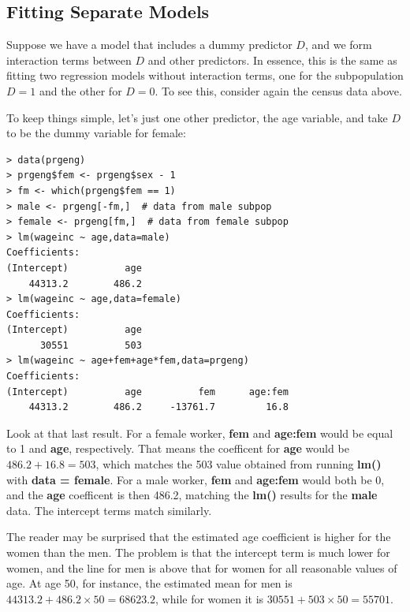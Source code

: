 \subsection{Fitting Separate Models}
\label{separate}

Suppose we have a model that includes a dummy predictor $D$, and we form
interaction terms between $D$ and other predictors.  In essence, this is
the same as fitting two regression models without interaction terms, one
for the subpopulation $D = 1$ and the other for $D = 0$.  To see this,
consider again the census data above.

To keep things simple, let's just one other predictor, the age variable,
and take $D$ to be the dummy variable for female:

\begin{lstlisting}
> data(prgeng) 
> prgeng$fem <- prgeng$sex - 1 
> fm <- which(prgeng$fem == 1) 
> male <- prgeng[-fm,]  # data from male subpop
> female <- prgeng[fm,]  # data from female subpop
> lm(wageinc ~ age,data=male) 
Coefficients:
(Intercept)          age  
    44313.2        486.2  
> lm(wageinc ~ age,data=female) 
Coefficients:
(Intercept)          age  
      30551          503  
> lm(wageinc ~ age+fem+age*fem,data=prgeng) 
Coefficients:
(Intercept)          age          fem      age:fem  
    44313.2        486.2     -13761.7         16.8  
\end{lstlisting}

Look at that last result.  For a female worker, {\bf fem} and {\bf
age:fem} would be equal to 1 and {\bf age}, respectively.  That means
the coefficent for {\bf age} would be $486.2 + 16.8 = 503$, which
matches the 503 value obtained from running {\bf lm()} with {\bf data =
female}.  For a male worker, {\bf fem} and {\bf age:fem} would both be
0, and the {\bf age} coefficent is then 486.2, matching the {\bf lm()}
results for the {\bf male} data.  The intercept terms match similarly.

The reader may be surprised that the estimated age coefficient is higher
for the women than the men.  The problem is that the intercept term is
much lower for women, and the line for men is above that for women for
all reasonable values of age.  At age 50, for instance, the estimated
mean for men is $44313.2 + 486.2 \times 50 = 68623.2$, while for women
it is $30551  + 503 \times 50 = 55701$. 

